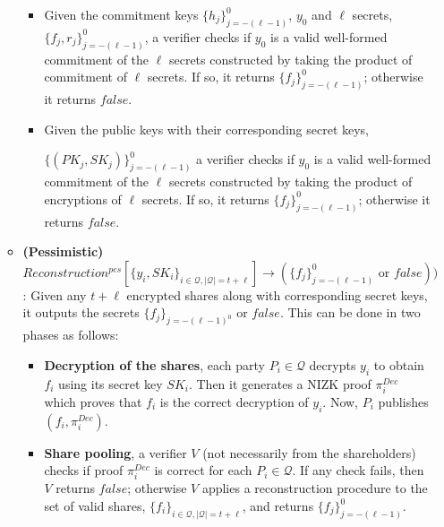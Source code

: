 \begin{definition}
\begin{itemize}
\begin{itemize}
              \begin{itemize}
                \item Given the commitment keys $\{h_j\}_{j=-(\ell-1)}^0$, $y_0$ and $\ell$ secrets, $\{f_j,r_j\}_{j=-(\ell-1)}^0$, 
                 a verifier checks if $y_0$ is a valid well-formed commitment of the $\ell$ secrets constructed by taking the product of commitment of $\ell$ secrets. If so, it returns 
                 $\{f_j\}_{j=-(\ell-1)}^0$; otherwise it returns $false$.
                \item Given the public keys with their corresponding secret keys,\par $\{(PK_j,SK_j)\}_{j=-(\ell-1)}^0$ 
                 a verifier checks if $y_0$ is a valid well-formed commitment of the $\ell$ secrets constructed by taking the product of encryptions of $\ell$ secrets. 
                 If so, it returns $\{f_j\}_{j=-(\ell-1)}^0$; otherwise it returns $false$.
              \end{itemize}
            \item \textbf{(Pessimistic)} $Reconstruction^{pes}[\{y_i,SK_i\}_{i\in\mathcal{Q},|\mathcal{Q}|=t+\ell}]\rightarrow(\{f_j\}_{j=-(\ell-1)}^0\text{ or }false))$: 
              Given any $t+\ell$ encrypted shares along with corresponding secret keys, it outputs the secrets 
              $\{f_j\}_{j=-(\ell-1)^0}$ or $false$. This can be done in two phases as follows: 
                \begin{itemize}
                  \item \textbf{Decryption of the shares}, each party $P_i\in\mathcal{Q}$ decrypts $y_i$ to obtain 
                    $f_i$ using its secret key $SK_i$. Then it generates a NIZK proof $\pi_i^{Dec}$ which proves that 
                    $f_i$ is the correct decryption of $y_i$. Now, $P_i$ publishes $(f_i,\pi_i^{Dec})$.
                  \item \textbf{Share pooling}, a verifier $V$ (not necessarily from the shareholders) checks if proof 
                   $\pi_i^{Dec}$ is correct for each $P_i\in\mathcal{Q}$. If any check fails, then $V$ returns $false$; 
                   otherwise $V$ applies a reconstruction procedure to the set of valid shares, $\{f_i\}_{i\in\mathcal{Q},|\mathcal{Q}|=t+\ell}$, 
                   and returns $\{f_j\}_{j=-(\ell-1)}^0$.
                \end{itemize}
          \end{itemize}
    \end{itemize}
\end{definition}

